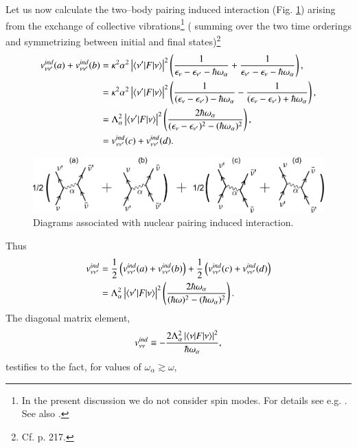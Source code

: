 \begin{subappendices}
Let us now calculate the two--body pairing induced interaction (Fig. \ref{fig3.A.2}) arising from the exchange of collective vibrations\footnote{In the present discussion we do not consider spin modes. For details see e.g. \cite{Idini:15}. See also \cite{Bortignon:83}.} ( summing over the two time orderings and symmetrizing between initial and final states)\footnote{Cf. \cite{Brink:05} p. 217.}
\begin{align}
\nonumber v_{\nu\nu'}^{ind}(a)+v_{\nu\nu'}^{ind}(b)&=\kappa^2\alpha^2\left|\langle {\nu'|F|\nu} \rangle\right|^2\left(\frac{1}{\epsilon_\nu-\epsilon_{\nu'}-\hbar\omega_\alpha}+\frac{1}{\epsilon_{\nu'}-\epsilon_{\nu}-\hbar\omega_\alpha}\right),\\
\nonumber &=\kappa^2\alpha^2\left|\langle {\nu'|F|\nu} \rangle\right|^2\left(\frac{1}{(\epsilon_\nu-\epsilon_{\nu'})-\hbar\omega_\alpha}-\frac{1}{(\epsilon_{\nu}-\epsilon_{\nu'})+\hbar\omega_\alpha}\right),\\
\nonumber &=\Lambda_\alpha^2\left|\langle {\nu'|F|\nu} \rangle\right|^2\left(\frac{2\hbar\omega_\alpha}{(\epsilon_\nu-\epsilon_{\nu'})^2-(\hbar\omega_\alpha)^2}\right),\\
&=v_{\nu\nu'}^{ind}(c)+v_{\nu\nu'}^{ind}(d).
\end{align}
   \begin{figure}
   \centerline{\includegraphics*[width=12cm,angle=0	]{nutshell/figs/fig3_A_2}}
   \caption{Diagrams associated with nuclear pairing induced interaction.}\label{fig3.A.2}
   \end{figure}
Thus
\begin{align}\label{eq3.A.17}
\nonumber v_{\nu\nu'}^{ind}&=\frac{1}{2}\left(v_{\nu\nu'}^{ind}(a)+v_{\nu\nu'}^{ind}(b)\right)+\frac{1}{2}\left(v_{\nu\nu'}^{ind}(c)+v_{\nu\nu'}^{ind}(d)\right)\\ &=\Lambda_\alpha^2\left|\langle {\nu'|F|\nu} \rangle\right|^2\left(\frac{2\hbar\omega_\alpha}{(\hbar\omega)^2-(\hbar\omega_\alpha)^2}\right).
\end{align}
The diagonal matrix element,
\begin{align}
\nonumber v_{\nu\nu}^{ind}\equiv-\frac{2\Lambda_\alpha^2\left|\langle {\nu|F|\nu} \rangle\right|^2}{\hbar\omega_\alpha},
\end{align}
testifies to the fact, for values of $\omega_\alpha\gtrsim\omega$, 

\end{subappendices}
